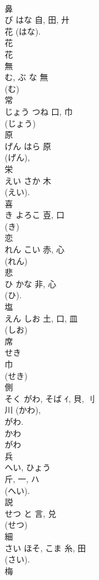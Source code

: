\documentclass[8pt]{extreport}
\begin{document}
\begin{CJK}{UTF8}{min}
\\	鼻	
\\	び	はな	自, 田, 廾	
\\	花 (はな). 
\\	花 
\\	花 
\\	無	
\\	む, ぶ	な	無	
\\	(む) 
\\	常	
\\	じょう	つね	口, 巾		
\\	(じょう) 
\\	原	
\\	げん	はら	原	
\\	(げん), 
\\	栄	
\\	えい	さか	木		
\\	(えい). 
\\	喜	
\\	き	よろこ	壴, 口	
\\	(き) 
\\	恋	
\\	れん	こい	赤, 心	
\\	(れん) 
\\	悲	
\\	ひ	かな	非, 心	
\\	(ひ). 
\\	塩	
\\	えん	しお	土, 口, 皿		
\\	(しお) 
\\	席	
\\	せき	
\\	巾		
\\	(せき) 
\\	側	
\\	そく	がわ, そば	ｲ, 貝, 刂	
\\	川 (かわ), 
\\	がわ.	
\\	かわ 
\\	がわ 
\\	兵	
\\	へい, ひょう	
\\	斤, 一, ハ	
\\	(へい). 
\\	説	
\\	せつ	と	言, 兑	
\\	(せつ) 
\\	細	
\\	さい	ほそ, こま	糸, 田	
\\	(さい). 
\\	梅	

\end{CJK}
\end{document}

